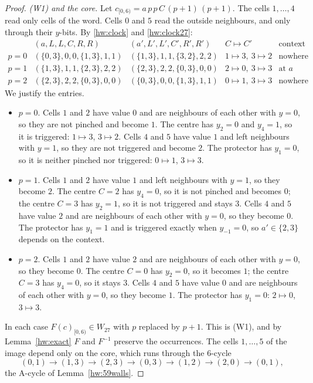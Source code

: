 \begin{proof}
\emph{(W1) and the core.} Let $c_{[0,6)}=a\,p\,p\,C\,(p+1)\,(p+1)$. The cells $1,\dots,4$ read only cells of the word. Cells $0$ and $5$ read the outside neighbours, and only through their $y$-bits. By \eqref{hw:clock} and \eqref{hw:clock27}:
\[
\begin{array}{ccccl}
 & (a,L,L,C,R,R) & (a',L',L',C',R',R') & C\mapsto C' & \text{context enters}\\ \hline
p=0 & (\{0,3\},0,0,\{1,3\},1,1) & (\{1,3\},1,1,\{3,2\},2,2) & 1\mapsto3,\ 3\mapsto2 & \text{nowhere}\\
p=1 & (\{1,3\},1,1,\{2,3\},2,2) & (\{2,3\},2,2,\{0,3\},0,0) & 2\mapsto0,\ 3\mapsto3 & \text{at }a\\
p=2 & (\{2,3\},2,2,\{0,3\},0,0) & (\{0,3\},0,0,\{1,3\},1,1) & 0\mapsto1,\ 3\mapsto3 & \text{nowhere}
\end{array}
\]
We justify the entries.
\begin{itemize}
\item $p=0$. Cells $1$ and $2$ have value $0$ and are neighbours of each other with $y=0$, so they are not pinched and become $1$. The centre has $y_2=0$ and $y_4=1$, so it is triggered: $1\mapsto3$, $3\mapsto2$. Cells $4$ and $5$ have value $1$ and left neighbours with $y=1$, so they are not triggered and become $2$. The protector has $y_1=0$, so it is neither pinched nor triggered: $0\mapsto1$, $3\mapsto3$.
\item $p=1$. Cells $1$ and $2$ have value $1$ and left neighbours with $y=1$, so they become $2$. The centre $C=2$ has $y_4=0$, so it is not pinched and becomes $0$; the centre $C=3$ has $y_2=1$, so it is not triggered and stays $3$. Cells $4$ and $5$ have value $2$ and are neighbours of each other with $y=0$, so they become $0$. The protector has $y_1=1$ and is triggered exactly when $y_{-1}=0$, so $a'\in\{2,3\}$ depends on the context.
\item $p=2$. Cells $1$ and $2$ have value $2$ and are neighbours of each other with $y=0$, so they become $0$. The centre $C=0$ has $y_2=0$, so it becomes $1$; the centre $C=3$ has $y_4=0$, so it stays $3$. Cells $4$ and $5$ have value $0$ and are neighbours of each other with $y=0$, so they become $1$. The protector has $y_1=0$: $2\mapsto0$, $3\mapsto3$.
\end{itemize}
In each case $F(c)_{[0,6)}\in W_{27}$ with $p$ replaced by $p+1$. This is (W1), and by Lemma~\ref{hw:exact} $F$ and $F^{-1}$ preserve the occurrences. The cells $1,\dots,5$ of the image depend only on the core, which runs through the $6$-cycle
\[
(0,1)\to(1,3)\to(2,3)\to(0,3)\to(1,2)\to(2,0)\to(0,1),
\]
the A-cycle of Lemma~\ref{hw:59walls}.


\end{proof}
